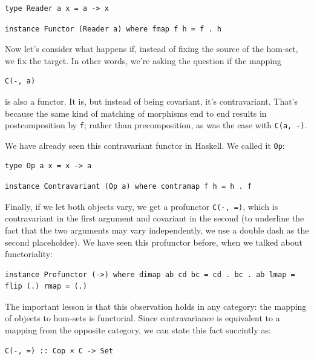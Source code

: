 \begin{verbatim}
type Reader a x = a -> x
\end{verbatim}

\begin{verbatim}
instance Functor (Reader a) where fmap f h = f . h
\end{verbatim}

Now let's consider what happens if, instead of fixing the source of the
hom-set, we fix the target. In other words, we're asking the question if
the mapping

\begin{verbatim}
C(-, a)
\end{verbatim}

is also a functor. It is, but instead of being covariant, it's
contravariant. That's because the same kind of matching of morphisms end
to end results in postcomposition by \texttt{f}; rather than
precomposition, as was the case with \texttt{C(a,\ -)}.

We have already seen this contravariant functor in Haskell. We called it
\texttt{Op}:

\begin{verbatim}
type Op a x = x -> a
\end{verbatim}

\begin{verbatim}
instance Contravariant (Op a) where contramap f h = h . f
\end{verbatim}

Finally, if we let both objects vary, we get a profunctor
\texttt{C(-,\ =)}, which is contravariant in the first argument and
covariant in the second (to underline the fact that the two arguments
may vary independently, we use a double dash as the second placeholder).
We have seen this profunctor before, when we talked about functoriality:

\begin{verbatim}
instance Profunctor (->) where dimap ab cd bc = cd . bc . ab lmap = flip (.) rmap = (.)
\end{verbatim}

The important lesson is that this observation holds in any category: the
mapping of objects to hom-sets is functorial. Since contravariance is
equivalent to a mapping from the opposite category, we can state this
fact succintly as:

\begin{verbatim}
C(-, =) :: Cop × C -> Set
\end{verbatim}

